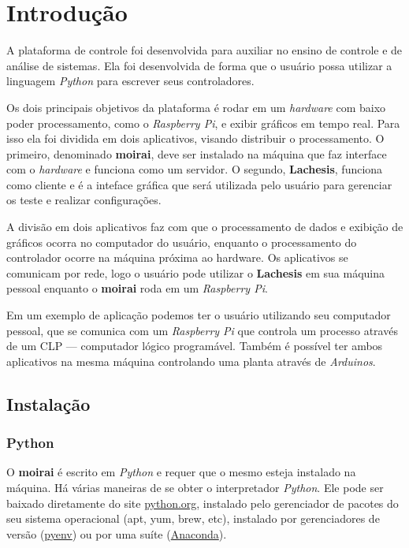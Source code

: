 
\chapter{Introdução}%
\label{chapter:introduction}

A plataforma de controle foi desenvolvida para auxiliar no ensino de controle e
de análise de sistemas. Ela foi desenvolvida de forma que o usuário possa
utilizar a linguagem \textit{Python} para escrever seus controladores.

Os dois principais objetivos da plataforma é rodar em um \textit{hardware} com
baixo poder processamento, como o \textit{Raspberry Pi}, e exibir gráficos em
tempo real. Para isso ela foi dividida em dois aplicativos, visando distribuir o
processamento. O primeiro, denominado \textbf{moirai}, deve ser instalado na
máquina que faz interface com o \textit{hardware} e funciona como um servidor. O
segundo, \textbf{Lachesis}, funciona como cliente e é a inteface gráfica que
será utilizada pelo usuário para gerenciar os teste e realizar configurações.

A divisão em dois aplicativos faz com que o processamento de dados e exibição de
gráficos ocorra no computador do usuário, enquanto o processamento do
controlador ocorre na máquina próxima ao hardware. Os aplicativos se comunicam
por rede, logo o usuário pode utilizar o \textbf{Lachesis} em sua máquina
pessoal enquanto o \textbf{moirai} roda em um \textit{Raspberry Pi}.

Em um exemplo de aplicação podemos ter o usuário utilizando seu computador
pessoal, que se comunica com um \textit{Raspberry Pi} que controla um processo
através de um CLP --- computador lógico programável. Também é possível ter ambos
aplicativos na mesma máquina controlando uma planta através de
\textit{Arduinos}.

\section{Instalação}%
\label{sec:installation}

\subsection{Python}%
\label{subsec:install-python}

O \textbf{moirai} é escrito em \textit{Python} e requer que o mesmo esteja
instalado na máquina. Há várias maneiras de se obter o interpretador
\textit{Python}. Ele pode ser baixado diretamente do site
\href{https://www.python.org}{python.org}, instalado pelo gerenciador de pacotes
do seu sistema operacional (apt, yum, brew, etc), instalado por gerenciadores de
versão (\href{https://github.com/pyenv/pyenv}{pyenv}) ou por uma suíte
(\href{https://www.continuum.io/downloads}{Anaconda}).


